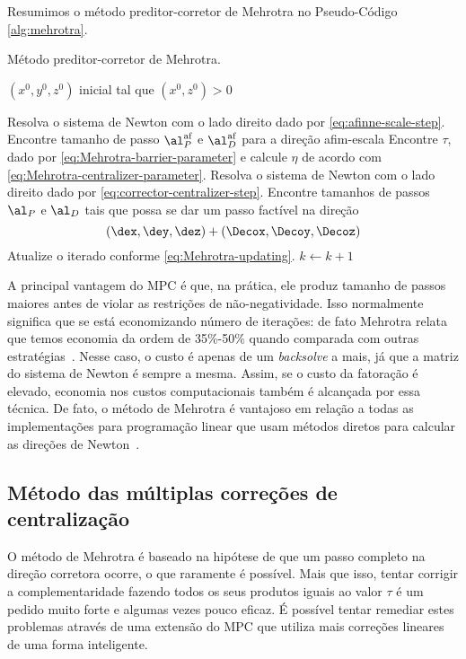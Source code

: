  Resumimos o método preditor-corretor de Mehrotra no Pseudo-Código
 \ref{alg:mehrotra}.
 \begin{algorithm}
\caption{Método preditor-corretor de Mehrotra.}
\label{alg:mehrotra}
\begin{algorithmic}[0] 
\Require $(x^0,y^0,z^0)$ inicial tal que $(x^0,z^0) > 0$ 

	\Repeat
		\State Resolva o sistema de Newton com o lado direito dado por
		\eqref{eq:afinne-scale-step}. 
		 \State Encontre tamanho de passo $\al_P^{\text{af}}$ e $\al_D^{\text{af}}$
		 para a direção afim-escala \State Encontre $\tau$, dado por \eqref{eq:Mehrotra-barrier-parameter} e
		 calcule $\eta$ de acordo com \eqref{eq:Mehrotra-centralizer-parameter}.
		 \State Resolva o sistema de Newton com o lado direito dado por
		  \eqref{eq:corrector-centralizer-step}.
		  \State Encontre tamanhos de passos $\al_P$ e $\al_D$  tais que possa se dar
		  um passo factível na direção  \[(\dex, \dey, \dez) +  (\Decox, \Decoy,
		  \Decoz)\] 
		  \State Atualize o iterado conforme 
		  \eqref{eq:Mehrotra-updating}.
		   \State $k\gets k+1$

\end{algorithmic}
\end{algorithm}
 
 
 A principal vantagem do \ac{MPC} é que, na prática, ele produz tamanho de
 passos maiores antes de violar as restrições de não-negatividade. Isso normalmente
 significa que se está economizando número de iterações: de fato Mehrotra relata
 que temos economia da ordem de 35\%-50\% quando comparada com outras
 estratégias~\cite{Mehrotra:1992wr}. Nesse
 caso, o custo é apenas de um \emph{backsolve} a mais, já que a matriz do
 sistema de Newton é sempre a mesma. Assim, se o custo da fatoração é elevado,
 economia nos custos computacionais também é alcançada por essa técnica. De 
 fato, o método de Mehrotra é vantajoso em relação a todas as implementações
 para programação linear que usam métodos diretos para calcular as direções de
 Newton~\cite[pg. 40]{Colombo:2008wm}.
 
 
 \subsection{Método das múltiplas correções de centralização}
 
O método de Mehrotra é baseado na hipótese de que um passo
completo na direção corretora ocorre, o que raramente é possível. Mais que
isso,  tentar corrigir a complementaridade fazendo todos os seus produtos
iguais ao valor $\tau$ é um pedido muito forte e algumas vezes pouco eficaz. 
É possível tentar remediar estes problemas através de uma extensão do \ac{MPC}
que utiliza mais correções lineares de uma forma inteligente.

